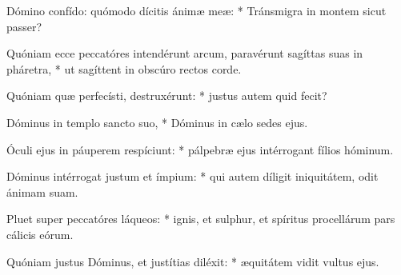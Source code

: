 \begin{psalmus}

     Dómino confído: quómodo dícitis ánimæ meæ: * Tránsmigra in montem sicut passer?

    Quóniam ecce peccatóres intendérunt arcum, paravérunt sagíttas suas in pháretra, * ut sagíttent in obscúro rectos corde.

    Quóniam quæ perfecísti, destruxérunt: * justus autem quid fecit?

    Dóminus in templo sancto suo, * Dóminus in cælo sedes ejus.

    Óculi ejus in páuperem respíciunt: * pálpebræ ejus intérrogant fílios hóminum.

    Dóminus intérrogat justum et ímpium: * qui autem díligit iniquitátem, odit ánimam suam.

    Pluet super peccatóres láqueos: * ignis, et sulphur, et spíritus procellárum pars cálicis eórum.

    Quóniam justus Dóminus, et justítias diléxit: * æquitátem vidit vultus ejus.

\end{psalmus}
